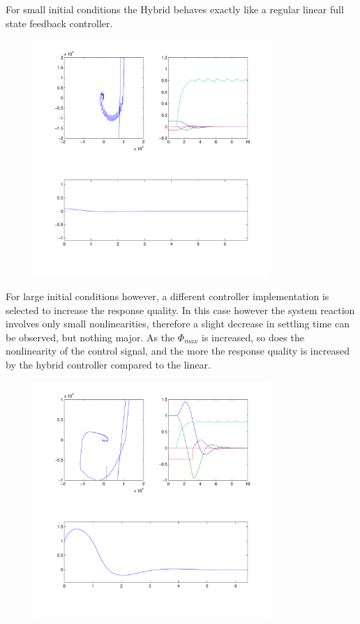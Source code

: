 For small initial conditions the Hybrid behaves exactly like a regular linear full state feedback controller.

\begin{figure}[H]
	\centering
	\includegraphics[width=0.8\textwidth]{img2/Hyb01}
	\caption{}
	\label{}
\end{figure}

For large initial conditions however, a different controller implementation is selected to increase the response quality. In this case however the system reaction involves only small nonlinearities, therefore a slight decrease in settling time can be observed, but nothing major. As the $\Phi_{max}$ is increased, so does the nonlinearity of the control signal, and the more the response quality is increased by the hybrid controller compared to the linear.

\begin{figure}[H]
	\centering
	\includegraphics[width=0.8\textwidth]{img2/Hyb11}
	\caption{}
	\label{}
\end{figure}

